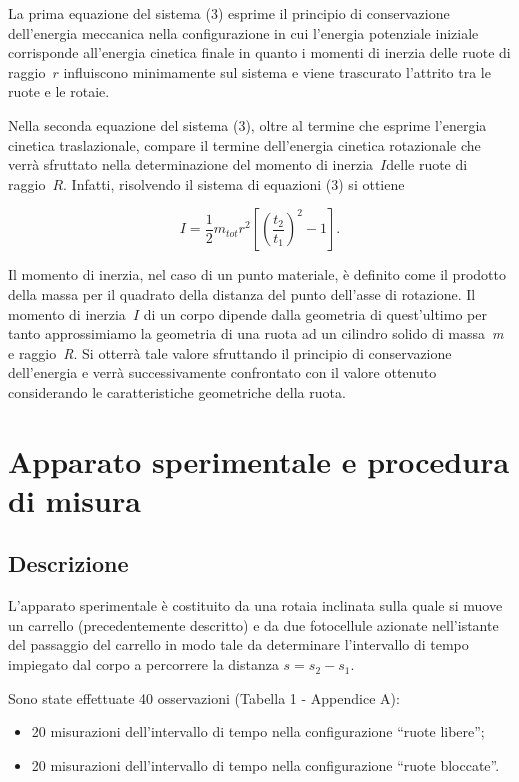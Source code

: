 \documentclass[10pt,a4paper]{article}
\providecommand{\tightlist}{\setlength{\itemsep}{0pt}\setlength{\parskip}{0pt}}%
\begin{document}
La prima equazione del sistema (3) esprime il principio di conservazione
dell'energia meccanica nella configurazione in cui l'energia potenziale
iniziale corrisponde all'energia cinetica finale in quanto i momenti di
inerzia delle ruote di raggio~\(r\) influiscono minimamente
sul sistema e viene trascurato l'attrito tra le ruote e le rotaie.~

Nella seconda equazione del sistema (3), oltre al termine che esprime
l'energia cinetica traslazionale, compare il termine dell'energia
cinetica rotazionale che verrà sfruttato nella determinazione del
momento di inerzia~\(I\)delle ruote di
raggio~\(R\). Infatti, risolvendo il sistema di equazioni
(3) si ottiene

\[I=\frac{1}{2}m_{tot} r^2\left[\left(\frac{t_2}{t_1}\right)^2-1\right].\]

Il momento di inerzia, nel caso di un punto materiale, è definito come
il prodotto della massa per il quadrato della distanza del punto
dell'asse di rotazione. Il momento di inerzia~\(I\) di un
corpo dipende dalla geometria di quest'ultimo per tanto approssimiamo la
geometria di una ruota ad un cilindro solido di massa~\emph{m} e
raggio~\emph{R}. Si otterrà tale valore sfruttando il principio di
conservazione dell'energia e verrà successivamente confrontato con il
valore ottenuto considerando le caratteristiche geometriche della ruota.

\section*{Apparato sperimentale e procedura di
misura}

{\label{507351}}

\subsection*{Descrizione}

{\label{588451}}

L'apparato sperimentale è costituito da una rotaia inclinata sulla quale
si muove un carrello (precedentemente descritto) e da due fotocellule
azionate nell'istante del passaggio del carrello in modo tale da
determinare l'intervallo di tempo impiegato dal corpo a percorrere la
distanza \(s=s_2 - s_1\).

Sono state effettuate 40 osservazioni (Tabella 1 - Appendice A):

\begin{itemize}
\tightlist
\item
  20 misurazioni dell'intervallo di tempo nella configurazione ``ruote
  libere'';
\item
  20 misurazioni dell'intervallo di tempo nella configurazione ``ruote
  bloccate''.
\end{itemize}
\end{document}
